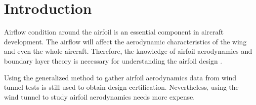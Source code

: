 \section{Introduction}

Airflow condition around the airfoil is an essential component in aircraft development. The airflow will affect the aerodynamic characteristics of the wing and even the whole aircraft. Therefore, the knowledge of airfoil aerodynamics and boundary layer theory is necessary for understanding the airfoil design \cite{eppler2012airfoil}.

Using the generalized method to gather airfoil aerodynamics data from wind tunnel tests is still used to obtain design certification. Nevertheless, using the wind tunnel to study airfoil aerodynamics needs more expense.
